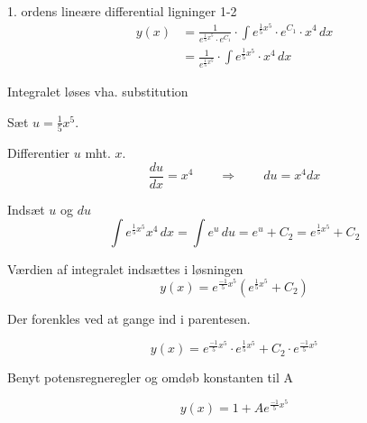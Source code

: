 \documentclass{article}
\begin{document}
\begin{exercise}{1. ordens lineære differential ligninger 1-2}
	\hint
	\begin{align*}
	y(x) &= \frac{1}{e^{\frac{1}{5}x^5} \cdot e^{C_1}} \cdot \int e^{\frac{1}{5}x^5} \cdot e^{C_1}  \cdot x^4 \, dx  \\
	&= \frac{1}{e^{\frac{1}{5}x^5}} \cdot \int e^{\frac{1}{5}x^5}  \cdot x^4 \, dx
	\end{align*}
	
	\hint
	
	Integralet løses vha. substitution
	
	
	\hint
	Sæt $u = \frac{1}{5}x^5$.
	
	\hint
	
	Differentier $u$ mht. $x$.
	\[
	\frac{du}{dx} = x^4 \qquad	\Rightarrow \qquad du = x^4 dx
	\]
	
	\hint 
	Indsæt $u$ og $du$
	\[
	\int e^{\frac{1}{5}x^5}x^4 \, dx = \int e^{u} \, du = e^{u} + C_2 = e^{\frac{1}{5}x^5} + C_2
	\]
	
	\hint
	
	Værdien af integralet indsættes i løsningen
	\[
	y(x) = e^{\frac{-1}{5}x^5} \left( e^{\frac{1}{5}x^5}+ C_2\right)
	\]
	
	\hint
	
	Der forenkles ved at gange ind i parentesen.
	
	\hint
	\[
	y(x) = e^{\frac{-1}{5}x^5} \cdot e^{\frac{1}{5}x^5} + C_2 \cdot e^{\frac{-1}{5}x^5} 
	\]
	
	\hint
	
	Benyt potensregneregler og omdøb konstanten til A
	
	\hint
	\[
	y(x) = 1 + A e^{\frac{-1}{5}x^5}
	\]
	
	
\end{exercise}

\newpage
\end{document}
